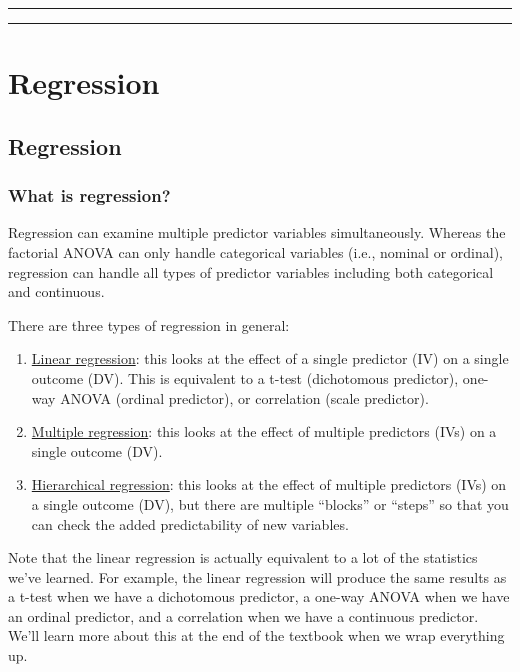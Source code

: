 \documentclass[
]{book}
\begin{document}
\begin{center}\rule{0.5\linewidth}{0.5pt}\end{center}

\begin{center}\rule{0.5\linewidth}{0.5pt}\end{center}

\hypertarget{part-regression}{%
\part{Regression}\label{part-regression}}

\hypertarget{regression}{%
\chapter{Regression}\label{regression}}

\hypertarget{what-is-regression}{%
\section{What is regression?}\label{what-is-regression}}

Regression can examine multiple predictor variables simultaneously. Whereas the factorial ANOVA can only handle categorical variables (i.e., nominal or ordinal), regression can handle all types of predictor variables including both categorical and continuous.

There are three types of regression in general:

\begin{enumerate}
\def\labelenumi{\arabic{enumi}.}
\item
  \underline{Linear regression}: this looks at the effect of a single predictor (IV) on a single outcome (DV). This is equivalent to a t-test (dichotomous predictor), one-way ANOVA (ordinal predictor), or correlation (scale predictor).
\item
  \underline{Multiple regression}: this looks at the effect of multiple predictors (IVs) on a single outcome (DV).
\item
  \underline{Hierarchical regression}: this looks at the effect of multiple predictors (IVs) on a single outcome (DV), but there are multiple ``blocks'' or ``steps'' so that you can check the added predictability of new variables.
\end{enumerate}

Note that the linear regression is actually equivalent to a lot of the statistics we've learned. For example, the linear regression will produce the same results as a t-test when we have a dichotomous predictor, a one-way ANOVA when we have an ordinal predictor, and a correlation when we have a continuous predictor. We'll learn more about this at the end of the textbook when we wrap everything up.
\end{document}
